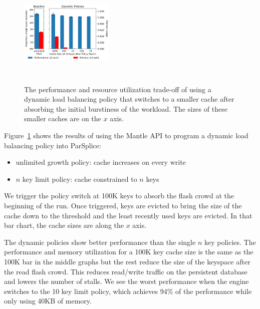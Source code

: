 \begin{figure}[t]
  \noindent\includegraphics[height=4.5cm,width=0.4\textwidth]{figures/methodology-tradeoff-dynamic.png}\\
  \caption{The performance and resource utilization trade-off of using a
  dynamic load balancing policy that switches to a smaller cache after absorbing
  the initial burstiness of the workload. The sizes of these smaller caches are
  on the \(x\) axis.  \label{fig:methodology-tradeoff-dynamic}}
\end{figure}

Figure~\ref{fig:methodology-tradeoff-dynamic} shows the results of using the
Mantle API to program a dynamic load balancing policy into
ParSplice:

\begin{itemize}
  \item unlimited growth policy: cache increases on every write
  \item \(n\) key limit policy: cache constrained to \(n\) keys
\end{itemize}

We trigger the policy switch at 100K keys to absorb the flash crowd at the
beginning of the run. Once triggered, keys are evicted to bring the size of the
cache down to the threshold and the least recently used keys are evicted.
In that bar chart, the cache sizes are along the \(x\) axis.

The dynamic policies show better performance than the single \(n\) key
policies. The performance and memory utilization for a 100K key cache size is
the same as the 100K bar in the middle graphs but the rest reduce the size of
the keyspace after the read flash crowd. This reduces read/write traffic on the
persistent database and lowers the number of stalls.  We see the worst
performance when the engine switches to the 10 key limit policy, which achieves
94\% of the performance while only using 40KB of memory. 

